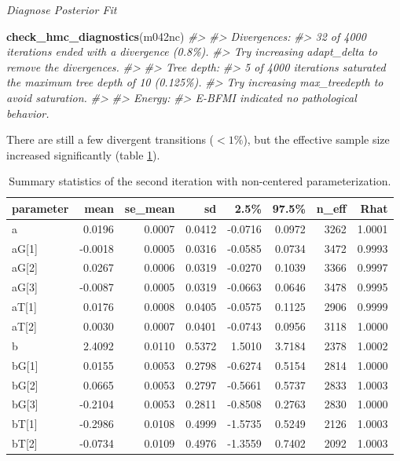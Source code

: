 \documentclass[11pt, oneside, openany]{scrbook}
\newenvironment{Shaded}{\begin{snugshade}}{\end{snugshade}}
\newcommand{\CommentTok}[1]{\textcolor[rgb]{0.56,0.35,0.01}{\textit{#1}}}
\newcommand{\FunctionTok}[1]{\textcolor[rgb]{0.13,0.29,0.53}{\textbf{#1}}}
\newcommand{\NormalTok}[1]{#1}
\begin{document}

\emph{Diagnose Posterior Fit}


\begin{Shaded}
\begin{Highlighting}[]
\FunctionTok{check\_hmc\_diagnostics}\NormalTok{(m042nc)}
\CommentTok{\#\textgreater{} }
\CommentTok{\#\textgreater{} Divergences:}
\CommentTok{\#\textgreater{} 32 of 4000 iterations ended with a divergence (0.8\%).}
\CommentTok{\#\textgreater{} Try increasing \textquotesingle{}adapt\_delta\textquotesingle{} to remove the divergences.}
\CommentTok{\#\textgreater{} }
\CommentTok{\#\textgreater{} Tree depth:}
\CommentTok{\#\textgreater{} 5 of 4000 iterations saturated the maximum tree depth of 10 (0.125\%).}
\CommentTok{\#\textgreater{} Try increasing \textquotesingle{}max\_treedepth\textquotesingle{} to avoid saturation.}
\CommentTok{\#\textgreater{} }
\CommentTok{\#\textgreater{} Energy:}
\CommentTok{\#\textgreater{} E{-}BFMI indicated no pathological behavior.}
\end{Highlighting}
\end{Shaded}


There are still a few divergent transitions (\(<1\%\)), but the effective sample size increased significantly (table \ref{tab:ch042-Bleeding-Tuna}).

\begin{table}[!h]
\centering
\caption{\label{tab:ch042-Bleeding-Tuna}Summary statistics of the second iteration with non-centered parameterization.}
\centering
\begin{tabular}[t]{lrrrrrrr}
\toprule
parameter & mean & se\_mean & sd & 2.5\% & 97.5\% & n\_eff & Rhat\\
\midrule
a & 0.0196 & 0.0007 & 0.0412 & -0.0716 & 0.0972 & 3262 & 1.0001\\
aG[1] & -0.0018 & 0.0005 & 0.0316 & -0.0585 & 0.0734 & 3472 & 0.9993\\
aG[2] & 0.0267 & 0.0006 & 0.0319 & -0.0270 & 0.1039 & 3366 & 0.9997\\
aG[3] & -0.0087 & 0.0005 & 0.0319 & -0.0663 & 0.0646 & 3478 & 0.9995\\
aT[1] & 0.0176 & 0.0008 & 0.0405 & -0.0575 & 0.1125 & 2906 & 0.9999\\
\addlinespace
aT[2] & 0.0030 & 0.0007 & 0.0401 & -0.0743 & 0.0956 & 3118 & 1.0000\\
b & 2.4092 & 0.0110 & 0.5372 & 1.5010 & 3.7184 & 2378 & 1.0002\\
bG[1] & 0.0155 & 0.0053 & 0.2798 & -0.6274 & 0.5154 & 2814 & 1.0000\\
bG[2] & 0.0665 & 0.0053 & 0.2797 & -0.5661 & 0.5737 & 2833 & 1.0003\\
bG[3] & -0.2104 & 0.0053 & 0.2811 & -0.8508 & 0.2763 & 2830 & 1.0000\\
\addlinespace
bT[1] & -0.2986 & 0.0108 & 0.4999 & -1.5735 & 0.5249 & 2126 & 1.0003\\
bT[2] & -0.0734 & 0.0109 & 0.4976 & -1.3559 & 0.7402 & 2092 & 1.0003\\
\bottomrule
\end{tabular}
\end{table}
\end{document}
